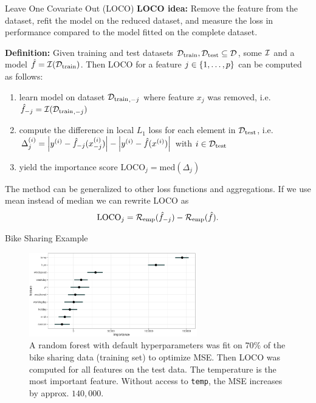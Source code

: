 \documentclass[11pt,compress,t,notes=noshow, aspectratio=169, xcolor=table]{beamer}
\begin{document}
\begin{frame}{Leave One Covariate Out (LOCO)  }
%
\textbf{LOCO idea:} Remove the feature from the dataset, refit the model on the reduced dataset, and measure the loss in performance compared to the model fitted on the complete dataset. %

\pause\lz

\textbf{Definition:} Given training and test datasets $\Dtrain, \Dtest \subseteq \D$, some $\ind$ and a model $\fh = \ind(\Dtrain)$. Then LOCO for a feature $j \in \pset$ can be computed as follows:
  \begin{enumerate}
    \item learn model on dataset ${\Dtrain}_{,-j}$ where feature $x_j$ was removed, i.e. $\fh_{-j} = \ind({\Dtrain}_{,-j})$\pause
    \item compute the difference in local $L_1$ loss for each element in $\Dtest$, i.e. $\Delta_j^{(i)} = \left  |y^{(i)} - \fh_{-j}(x_{-j}^{(i)}) \right | - \left |y^{(i)} - \fh(x^{(i)}) \right | $ with $i \in \Dtest$\pause
    \item yield the importance score $\text{LOCO}_j = \text{med} \left ( \Delta_j  \right )$
  \end{enumerate}
\lz\pause
The method can be generalized to other loss functions and aggregations. If we use mean instead of median we can rewrite LOCO as
%
$$ \text{LOCO}_j = \riske(\fh_{-j}) - \riske(\fh).$$
\end{frame}

\begin{frame}{Bike Sharing Example}
%
\begin{figure}
  \centering
  \includegraphics[width=0.65\textwidth]{figure_man/bike_sharing_loco.pdf}
\caption{A random forest with default hyperparameters was fit on $70\%$ of the bike sharing data (training set) to optimize MSE. Then LOCO was computed for all features on the test data. The temperature is the most important feature. Without access to \texttt{temp}, the MSE increases by approx. $140,000$.}
\end{figure}
%
%
\end{frame}
\end{document}

